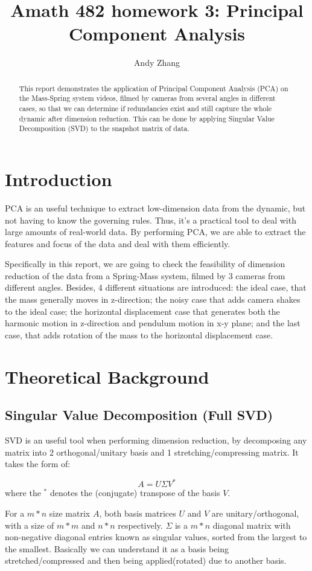 \documentclass[10pt]{article}
\begin{document}
\title{Amath 482 homework 3: Principal Component Analysis}
\author{Andy Zhang}
\maketitle

\begin{abstract}
This report demonstrates the application of Principal Component Analysis (PCA) on the Mass-Spring system videos, filmed by cameras from several angles in different cases, so that we can determine if redundancies exist and still capture the whole dynamic after dimension reduction. This can be done by applying Singular Value Decomposition (SVD) to the snapshot matrix of data.
\end{abstract}

\section{Introduction}
PCA is an useful technique to extract low-dimension data from the dynamic, but not having to know the governing rules. Thus, it's a practical tool to deal with large amounts of real-world data. By performing PCA, we are able to extract the features and focus of the data and deal with them efficiently.
\par
\vskip 0.1cm
Specifically in this report, we are going to check the feasibility of dimension reduction of the data from a Spring-Mass system, filmed by 3 cameras from different angles. Besides, 4 different situations are introduced: the ideal case, that the mass generally moves in z-direction; the noisy case that adds camera shakes to the ideal case; the horizontal displacement case that generates both the harmonic motion in z-direction and pendulum motion in x-y plane; and the last case, that adds rotation of the mass to the horizontal displacement case.

\section{Theoretical Background}
\subsection{Singular Value Decomposition (Full SVD)}
SVD is an useful tool when performing dimension reduction, by decomposing any matrix into 2 orthogonal/unitary basis and 1 stretching/compressing matrix. It takes the form of:

\begin{equation}\label{1}
A=U \Sigma V^{*}
\end{equation}
where the $^{*}$ denotes the (conjugate) transpose of the basis $V$.
\par
\vskip 0.1cm
For a $m*n$ size matrix $A$, both basis matrices $U$ and $V$ are unitary/orthogonal, with a size of $m*m$ and $n*n$ respectively. $\Sigma$ is a $m*n$ diagonal matrix with non-negative diagonal entries known as singular values, sorted from the largest to the smallest. Basically we can understand it as a basis being stretched/compressed and then being applied(rotated) due to another basis.
\end{document}
